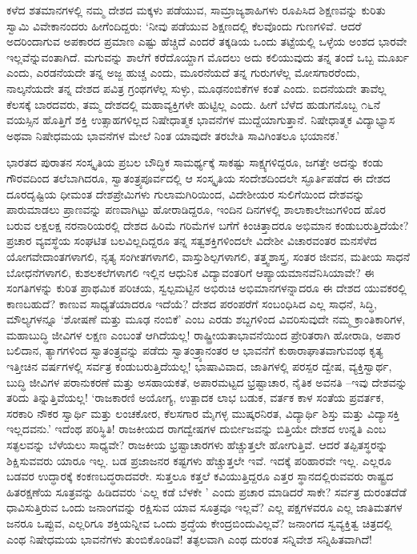 ಕಳೆದ ಶತಮಾನಗಳಲ್ಲಿ ನಮ್ಮ ದೇಶದ ಮಕ್ಕಳು ಪಡೆಯುವ, ಸಾಮ್ರಾಜ್ಯಶಾಹಿಗಳು ರೂಪಿಸಿದ ಶಿಕ್ಷಣವನ್ನು ಕುರಿತು ಸ್ವಾಮಿ ವಿವೇಕಾನಂದರು ಹೀಗೆಂದಿದ್ದರು: ‘ನೀವು ಪಡೆಯುವ ಶಿಕ್ಷಣದಲ್ಲಿ ಕೆಲವೊಂದು ಗುಣಗಳಿವೆ. ಆದರೆ ಅದರಿಂದಾಗುವ ಅಪಕಾರದ ಪ್ರಮಾಣ ಎಷ್ಟು ಹೆಚ್ಚಿದೆ ಎಂದರೆ ತಕ್ಕಡಿಯ ಒಂದು ತಟ್ಟೆಯಲ್ಲಿ ಒಳ್ಳೆಯ ಅಂಶದ ಭಾರವೇ ಇಲ್ಲವೆನ್ನುವಂತಾಗಿದೆ. ಮಗುವನ್ನು ಶಾಲೆಗೆ ಕರೆದೊಯ್ದಾಗ ಮೊದಲು ಅದು ಕಲಿಯುವುದು ತನ್ನ ತಂದೆ ಒಬ್ಬ ಮೂರ್ಖ ಎಂದು, ಎರಡನೆಯದೇ ತನ್ನ ಅಜ್ಜ ಹುಚ್ಚ ಎಂದು, ಮೂರನೆಯದೆ ತನ್ನ ಗುರುಗಳೆಲ್ಲ ಮೋಸಗಾರರೆಂದು, ನಾಲ್ಕನೆಯದೇ ತನ್ನ ದೇಶದ ಪವಿತ್ರ ಗ್ರಂಥಗಳೆಲ್ಲ ಸುಳ್ಳು, ಮೂಢನಂಬಿಕೆಗಳ ಕಂತೆ ಎಂದು. ಐದನೆಯದೇ ತಾವೆಲ್ಲ ಕೆಲಸಕ್ಕೆ ಬಾರದವರು, ತಮ್ಮ ದೇಶದಲ್ಲಿ ಮಹಾವ್ಯಕ್ತಿಗಳೇ ಹುಟ್ಟಿಲ್ಲ ಎಂದು. ಹೀಗೆ ಬೆಳೆದ ಹುಡುಗನೊಬ್ಬ ೧೬ನೆ ವಯಸ್ಸಿನ ಹೊತ್ತಿಗೆ ಶಕ್ತಿ ಉತ್ಸಾಹಗಳಿಲ್ಲದ ನಿಷೇಧಾತ್ಮಕ ಭಾವನೆಗಳ ಮುದ್ದೆಯಾಗುತ್ತಾನೆ. ನಿಷೇಧಾತ್ಮಕ ವಿದ್ಯಾಭ್ಯಾಸ ಅಥವಾ ನಿಷೇಧಮಯ ಭಾವನೆಗಳ ಮೇಲೆ ನಿಂತ ಯಾವುದೇ ತರಬೇತಿ ಸಾವಿಗಿಂತಲೂ ಭಯಾನಕ.’

ಭಾರತದ ಪುರಾತನ ಸಂಸ್ಕೃತಿಯ ಪ್ರಬಲ ಬೌದ್ಧಿಕ ಸಾಮರ್ಥ್ಯಕ್ಕೆ ಸಾಕಷ್ಟು ಸಾಕ್ಷ್ಯಗಳಿದ್ದರೂ, ಜಗತ್ತೇ ಅದನ್ನು ಕಂಡು ಗೌರವದಿಂದ ತಲೆಬಾಗಿದರೂ, ಸ್ವಾತಂತ್ರ್ಯಪೂರ್ವದಲ್ಲಿ ಆ ಸಂಸ್ಕೃತಿಯ ಸಂದೇಶದಿಂದಲೇ ಸ್ಫೂರ್ತಿಪಡೆದ ಈ ದೇಶದ ದೂರದೃಷ್ಟಿಯ ಧೀಮಂತ ದೇಶಪ್ರೇಮಿಗಳು ಗುಲಾಮಗಿರಿಯಿಂದ, ವಿದೇಶೀಯರ ಸುಲಿಗೆಯಿಂದ ದೇಶವನ್ನು ಪಾರುಮಾಡಲು ಪ್ರಾಣವನ್ನು ಪಣವಾಗಿಟ್ಟು ಹೋರಾಡಿದ್ದರೂ, ಇಂದಿನ ದಿನಗಳಲ್ಲಿ ಶಾಲಾಕಾಲೇಜುಗಳಿಂದ ಹೊರ ಬರುವ ಲಕ್ಷಲಕ್ಷ ನರನಾರಿಯರಲ್ಲಿ ದೇಶದ ಹಿರಿಮೆ ಗರಿಮೆಗಳ ಬಗೆಗೆ ಕಿಂಚಿತ್ತಾದರೂ ಅಭಿಮಾನ ಕಂಡು\-ಬರುತ್ತಿದೆಯೇ? ಪ್ರಚಾರ ವ್ಯವಸ್ಥೆಯ ಸಂಘಟಿತ ಬಲವಿಲ್ಲದಿದ್ದರೂ ತನ್ನ ಸತ್ವಶಕ್ತಿಗಳಿಂದಲೇ ವಿದೇಶೀ ವಿಚಾರವಂತರ ಮನಸೆಳೆದ ಯೋಗವೇದಾಂತಗಳಾಗಲಿ, ನೃತ್ಯ ಸಂಗೀತಗಳಾಗಲಿ, ವಾಸ್ತು\-ಶಿಲ್ಪಗಳಾಗಲಿ, ತತ್ತ್ವಶಾಸ್ತ್ರ, ಸಂತರ ಜೀವನ, ಮತೀಯ ಸಾಧನೆ ಬೋಧನೆಗಳಾಗಲಿ, ಕುಶಲಕಲೆ\-ಗಳಾಗಲಿ ಇಲ್ಲಿನ ಆಧುನಿಕ ವಿದ್ಯಾವಂತರಿಗೆ ಆಪ್ಯಾಯಮಾನವೆನಿಸಿಯಾವೇ? ಈ ಸಂಗತಿಗಳನ್ನು ಕುರಿತ ಪ್ರಾಥಮಿಕ ಪರಿಚಯ, ಸ್ವಲ್ಪಮಟ್ಟಿನ ಅಭಿರುಚಿ ಅಭಿಮಾನಗಳನ್ನಾದರೂ ಈ ದೇಶದ ಯುವಕರಲ್ಲಿ ಕಾಣಬಹುದೆ? ಕಾಣುವ ಸಾಧ್ಯತೆಯಾದರೂ ಇದೆಯೆ? ದೇಶದ ಪರಂಪರೆಗೆ ಸಂಬಂಧಿಸಿದ ಎಲ್ಲ ಸಾಧನೆ, ಸಿದ್ಧಿ, ಮೌಲ್ಯಗಳನ್ನೂ ‘ಶೋಷಣೆ ಮತ್ತು ಮೂಢ ನಂಬಿಕೆ’ ಎಂಬ ಎರಡು ಶಬ್ದಗಳಿಂದ ವಿವರಿಸುವುದೇ ನಮ್ಮ ಕ್ರಾಂತಿಕಾರಿಗಳ, ಮಹಾಬುದ್ಧಿ ಜೀವಿಗಳ ಲಕ್ಷಣ ಎಂಬಂತೆ ಆಗಿದೆಯಲ್ಲ! ರಾಷ್ಟ್ರೀಯತಾಭಾವನೆಯಿಂದ ಪ್ರೇರಿತರಾಗಿ ಹೋರಾಡಿ, ಅಪಾರ ಬಲಿದಾನ, ತ್ಯಾಗಗಳಿಂದ ಸ್ವಾತಂತ್ರ್ಯವನ್ನು ಪಡೆದು ಸ್ವಾತಂತ್ರ್ಯಾನಂತರ ಆ ಭಾವನೆಗೆ ಕುಠಾರಾಘಾತವಾಗುವಂಥ ಕೃತ್ಯ ಇತ್ತೀಚಿನ ವರ್ಷಗಳಲ್ಲಿ ಸರ್ವತ್ರ ಕಂಡುಬರುತ್ತಿದೆಯಲ್ಲ! ಭಾಷಾವಿವಾದ, ಜಾತಿಗಳಲ್ಲಿ ಪರಸ್ಪರ ದ್ವೇಷ, ವ್ಯಕ್ತಿಸ್ವಾರ್ಥ, ಬುದ್ಧಿ ಜೀವಿಗಳ ಪರಾನುಕರಣೆ ಮತ್ತು ಅಸಹಾಯಕತೆ, ಅಪಾರಮಟ್ಟದ ಭ್ರಷ್ಟಾಚಾರ, ನೈತಿಕ ಅವನತಿ –ಇವು ದೇಶವನ್ನು ತರಿದು ತಿನ್ನುತ್ತಿವೆಯಲ್ಲ! ‘ರಾಜಕಾರಣಿ ಅಯೋಗ್ಯ, ಉತ್ಪಾದಕ ಲಾಭ ಬಡುಕ, ವರ್ತಕ ಕಾಳ ಸಂತೆಯ ಪ್ರವರ್ತಕ, ಸರಕಾರಿ ನೌಕರ ಸ್ವಾರ್ಥಿ ಮತ್ತು ಲಂಚಕೋರ, ಕೆಲಸಗಾರ ಮೈಗಳ್ಳ ಮುಷ್ಕರನಿರತ, ವಿದ್ಯಾರ್ಥಿ ಶಿಸ್ತು ಮತ್ತು ವಿದ್ಯಾಸಕ್ತಿ ಇಲ್ಲದವನು.’ ಇದೆಂಥ ಪರಿಸ್ಥಿತಿ! ರಾಜಕೀಯದ ರಾಗದ್ವೇಷಗಳ ದುರ್ಬೀಜವನ್ನು ಬಿತ್ತಿಯೇ ದೇಶದ ಉನ್ನತಿ ಎಂಬ ಸತ್ಫಲವನ್ನು ಬೆಳೆಯಲು ಸಾಧ್ಯವೇ? ರಾಜಕೀಯ ಭ್ರಷ್ಟಾಚಾರಗಳು ಹೆಚ್ಚುತ್ತಲೇ ಹೋಗುತ್ತಿವೆ. ಆದರೆ ತಪ್ಪಿತಸ್ಥರನ್ನು ಶಿಕ್ಷಿಸುವವರು ಯಾರೂ ಇಲ್ಲ. ಬಡ ಪ್ರಜಾಜನರ ಕಷ್ಟಗಳು ಹೆಚ್ಚುತ್ತಲೇ ಇವೆ. ಇದಕ್ಕೆ ಪರಿಹಾರವೇ ಇಲ್ಲ. ಎಲ್ಲರೂ ಬಡವರ ಉದ್ಧಾರಕ್ಕೆ ಕಂಕಣಬದ್ಧರಾದವರೇ. ಸುತ್ತಲೂ ಕತ್ತಲೆ ಕವಿಯುತ್ತಿದ್ದರೂ ಎತ್ತರ ಸ್ಥಾನದಲ್ಲಿರುವವರು ರಾಷ್ಟ್ರದ ಹಿತರಕ್ಷಣೆಯ ಸೂತ್ರವನ್ನು ಹಿಡಿದವರು ‘ಎಲ್ಲ ಕಡೆ ಬೆಳಕೇ ’ ಎಂದು ಪ್ರಚಾರ ಮಾಡಿದರೆ ಸಾಕೇ? ಸರ್ವತ್ರ ದುರಂತದೆಡೆ ಧಾವಿಸುತ್ತಿರುವ ಒಂದು ಜನಾಂಗವನ್ನು ರಕ್ಷಿಸುವ ಯಾವ ಸೂತ್ರವೂ ಇಲ್ಲವೆ? ಎಲ್ಲ ಪಕ್ಷಗಳವರೂ ಎಲ್ಲ ಜಾತಿಮತಗಳ ಜನರೂ ಒಪ್ಪುವ, ಎಲ್ಲರಿಗೂ ಶಕ್ತಿಯನ್ನೀವ ಒಂದು ಶ್ರದ್ಧೆಯ ಕೇಂದ್ರಬಿಂದುವಿಲ್ಲವೆ? ಜನಾಂಗದ ಸ್ವವ್ಯಕ್ತಿತ್ವ ಚಿತ್ರದಲ್ಲಿ ಎಂಥ ನಿಷೇಧಮಯ ಭಾವನೆಗಳು ತುಂಬಿಕೊಂಡಿವೆ! ತತ್ಫಲವಾಗಿ ಎಂಥ ದುರಂತ ಸನ್ನಿವೇಶ ಸನ್ನಿಹಿತವಾಗಿದೆ!


